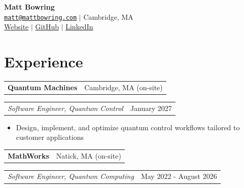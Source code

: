 \documentclass[11pt,a4paper,sans]{moderncv}
\makeatletter
\newlength{\entrygap}
\newcommand{\headergap}[0]{\vspace{-1cm}}
\newcommand{\company}[2]{%
  \par\addvspace{\entrygap}%
  \noindent\begin{tabular*}{\textwidth}{@{}l@{\extracolsep{\fill}}r@{}}%
    \textbf{#1} & #2
  \end{tabular*}\par
}
\newcommand{\role}[2]{%
  \par\noindent\begin{tabular*}{\textwidth}{@{}l@{\extracolsep{\fill}}r@{}}%
    \textit{#1} & #2
  \end{tabular*}\par
}
\makeatother
\begin{document}
\begin{center}
    {\Huge\bfseries Matt Bowring}\\
    \href{mailto:matt@mattbowring.com}{\texttt{matt@mattbowring.com}} $|$ Cambridge, MA \\
    \href{https://www.mattbowring.com}{\color{blue} Website} $|$
    \href{https://github.com/bowrango}{\color{blue} GitHub} $|$
    \href{https://www.linkedin.com/in/matt-bowring-463610149/}{\color{blue} LinkedIn}
\end{center}

\headergap

\section{Experience}

\company{Quantum Machines}{Cambridge, MA (on-site)}
\role{Software Engineer, Quantum Control}{January 2027}

\begin{itemize}
\item Design, implement, and optimize quantum control workflows tailored to customer applications
\end{itemize}

\company{MathWorks}{Natick, MA (on-site)}
\role{Software Engineer, Quantum Computing}{May 2022 - August 2026}
\end{document}
